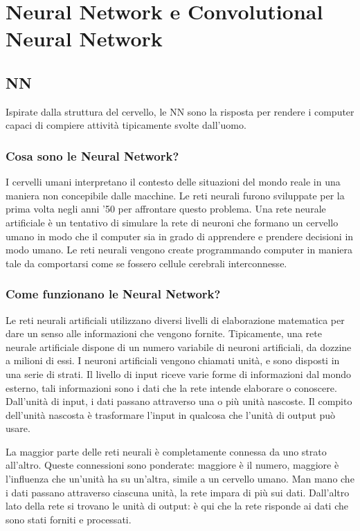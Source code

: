 \graphicspath{ {img/3/} }
\chapter{Neural Network e Convolutional Neural Network}\label{cap:NNeCNN}
\thispagestyle{empty} %
\newpage

\section{\acf{NN}}
\vspace{8mm}


Ispirate dalla struttura del cervello, le \acf{NN} sono la risposta per rendere i computer capaci di compiere attività tipicamente svolte dall'uomo.
\subsection{Cosa sono le Neural Network?}

I cervelli umani interpretano il contesto delle situazioni del mondo reale in una maniera non concepibile dalle macchine. Le reti neurali furono sviluppate per la prima volta negli anni '50 per affrontare questo problema. Una rete neurale artificiale è un tentativo di simulare la rete di neuroni che formano un cervello umano in modo che il computer sia in grado di apprendere e prendere decisioni in modo umano. Le reti neurali vengono create programmando computer in maniera tale da comportarsi come se fossero cellule cerebrali interconnesse.
\subsection{Come funzionano le Neural Network?}

Le reti neurali artificiali utilizzano diversi livelli di elaborazione matematica per dare un senso alle informazioni che vengono fornite. Tipicamente, una rete neurale artificiale dispone di un numero variabile di neuroni artificiali, da dozzine a milioni di essi. I neuroni artificiali vengono chiamati unità, e sono disposti in una serie di strati. Il livello di input riceve varie forme di informazioni dal mondo esterno, tali informazioni sono i dati che la rete intende elaborare o conoscere. Dall'unità di input, i dati passano attraverso una o più unità nascoste. Il compito dell'unità nascosta è trasformare l'input in qualcosa che l'unità di output può usare.

La maggior parte delle reti neurali è completamente connessa da uno strato all'altro. Queste connessioni sono ponderate: maggiore è il numero, maggiore è l'influenza che un'unità ha su un'altra, simile a un cervello umano. Man mano che i dati passano attraverso ciascuna unità, la rete impara di più sui dati. Dall'altro lato della rete si trovano le unità di output: è qui che la rete risponde ai dati che sono stati forniti e processati.

